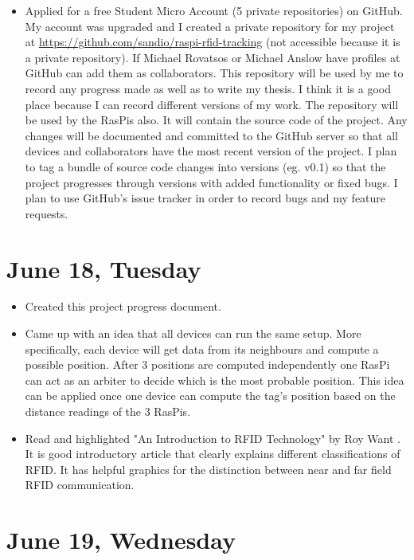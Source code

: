 \documentclass[a4paper,12pt]{article}
\begin{document}
\begin{itemize}
	\item Applied for a free Student Micro Account (5 private repositories) on GitHub. My account was upgraded and I created a private repository for my project at \url{https://github.com/sandio/raspi-rfid-tracking} (not accessible because it is a private repository). If Michael Rovatsos or Michael Anslow have profiles at GitHub can add them as collaborators. This repository will be used by me to record any progress made as well as to write my thesis. I think it is a good place because I can record different versions of my work. The repository will be used by the RasPis also. It will contain the source code of the project. Any changes will be documented and committed to the GitHub server so that all devices and collaborators have the most recent version of the project. I plan to tag a bundle of source code changes into versions (eg. v0.1) so that the project progresses through versions with added functionality or fixed bugs. I plan to use GitHub's issue tracker in order to record bugs and my feature requests.
\end{itemize}

\section{June 18, Tuesday}

\begin{itemize}
	\item Created this project progress document.
	\item Came up with an idea that all devices can run the same setup. More specifically, each device will get data from its neighbours and compute a possible position. After 3 positions are computed independently one RasPi can act as an arbiter to decide which is the most probable position. This idea can be applied once one device can compute the tag's position based on the distance readings of the 3 RasPis.
	\item Read and highlighted "An Introduction to RFID Technology" by Roy Want \cite{Want2006}. It is good introductory article that clearly explains different classifications of RFID. It has helpful graphics for the distinction between near and far field RFID communication.
\end{itemize}

\section{June 19, Wednesday}
\end{document}
